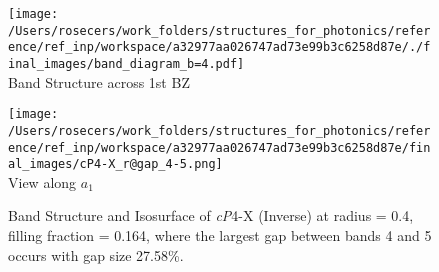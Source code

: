 \begin{figure}[H]
\begin{minipage}{0.5\textwidth}\centering
\texttt{[image: /Users/rosecers/work\_folders/structures\_for\_photonics/reference/ref\_inp/workspace/a32977aa026747ad73e99b3c6258d87e/./final\_images/band\_diagram\_b=4.pdf]}
\\Band Structure across 1st BZ
\end{minipage}\hfill
\begin{minipage}{0.48\textwidth}\centering
\texttt{[image: /Users/rosecers/work\_folders/structures\_for\_photonics/reference/ref\_inp/workspace/a32977aa026747ad73e99b3c6258d87e/final\_images/cP4-X\_r@gap\_4-5.png]}
\\View along $a_1$ 
\end{minipage}\hfill\caption{Band Structure and Isosurface of \textit{cP}4-X (Inverse) at radius = 0.4, filling fraction = 0.164, where the largest gap between bands 4 and 5 occurs with gap size 27.58\%.}

\end{figure}
\vspace{-0.25in}

